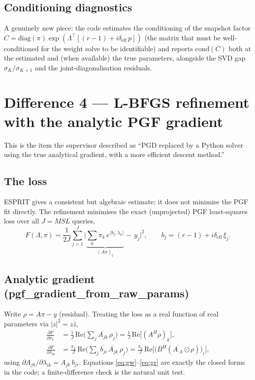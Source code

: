 \documentclass[11pt]{article}
\newcommand{\inner}[2]{\langle #1, #2 \rangle}
\newcommand{\lam}{\bm{\lambda}}
\newcommand{\Lam}{\bm{\Lambda}}
\newcommand{\bp}{\bm{p}}
\newcommand{\bxi}{\bm{\xi}}
\newcommand{\bb}{\bm{b}}
\newcommand{\deff}{\delta_{\mathrm{eff}}}
\newcommand{\code}[1]{\texttt{\small #1}}
\def\code#1{#1}%
\def\small{}%
\def\bm#1{#1}%
\theoremstyle{definition}
\begin{document}
\subsection{Conditioning diagnostics}
A genuinely new piece: the code estimates the conditioning of the snapshot factor
$C = \mathrm{diag}(\pi)\exp(\Lam^\top[(r-1)+i\deff\,\bp])$ (the matrix that must be
well-conditioned for the weight solve to be identifiable) and reports $\mathrm{cond}(C)$ both
at the estimated and (when available) the true parameters, alongside the SVD gap
$\sigma_K/\sigma_{K+1}$ and the joint-diagonalisation residuals.

\section{Difference 4 --- L-BFGS refinement with the analytic PGF gradient}\label{sec:refine}

This is the item the supervisor described as ``PGD replaced by a Python solver using the true
analytical gradient, with a more efficient descent method.''

\subsection{The loss}
ESPRIT gives a consistent but algebraic estimate; it does not minimise the PGF fit directly.
The refinement minimises the exact (unprojected) PGF least-squares loss over all $J=MSL$
queries,
\begin{equation}
F(\Lam,\bm\pi)=\frac{1}{2J}\sum_{j=1}^{J}\Big|\underbrace{\textstyle\sum_{k}\pi_k\,e^{\inner{\bb_j}{\lam_k}}}_{(A\bm\pi)_j}-\,y_j\Big|^2,
\qquad \bb_j=(r-1)+i\deff\,\bxi_j .
\label{eq:Floss}
\end{equation}

\subsection{Analytic gradient (\code{pgf\_gradient\_from\_raw\_params})}
Write $\bm\rho = A\bm\pi-\bm y$ (residual). Treating the loss as a real function of real
parameters via $|z|^2=z\bar z$,
\begin{align}
\frac{\partial F}{\partial \pi_k}
 &= \frac1J\,\mathrm{Re}\!\Big(\textstyle\sum_j \overline{A_{jk}}\,\rho_j\Big)
  = \frac1J\,\mathrm{Re}\big[(A^{H}\bm\rho)_k\big],
 \label{eq:gw}\\[1mm]
\frac{\partial F}{\partial \lambda_{ik}}
 &= \frac{\pi_k}{J}\,\mathrm{Re}\!\Big(\textstyle\sum_j \overline{b_{ji}}\,\overline{A_{jk}}\,\rho_j\Big)
  = \frac{\pi_k}{J}\,\mathrm{Re}\big[\big(B^{H}(\overline{A_{:k}}\odot\bm\rho)\big)_i\big],
 \label{eq:gr}
\end{align}
using $\partial A_{jk}/\partial\lambda_{ik}=A_{jk}\,b_{ji}$. Equations \eqref{eq:gw}--\eqref{eq:gr}
are exactly the closed forms in the code; a finite-difference check is the natural unit test.
\end{document}
